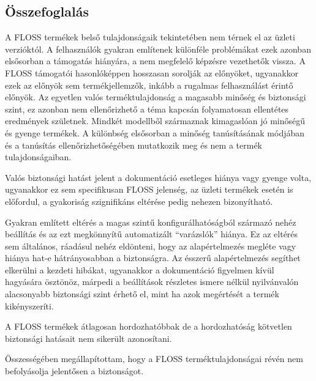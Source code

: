 \documentclass[12pt,magyar,a4paper,oneside]{scrreprt}
\begin{document}
\hypertarget{uxf6sszefoglaluxe1s-3}{%
\subsection{Összefoglalás}\label{uxf6sszefoglaluxe1s-3}}

A FLOSS termékek belső tulajdonságaik tekintetében nem térnek el az
üzleti verzióktól. A felhasználók gyakran említenek különféle
problémákat ezek azonban elsősorban a támogatás hiányára, a nem
megfelelő képzésre vezethetők vissza. A FLOSS támogatói hasonlóképpen
hosszasan sorolják az előnyöket, ugyanakkor ezek az előnyök sem
termékjellemzők, inkább a rugalmas felhasználást érintő előnyök. Az
egyetlen valós terméktulajdonság a magasabb minőség és biztonsági szint,
ez azonban nem ellenőrizhető a téma kapcsán folyamatosan ellentétes
eredmények születnek. Mindkét modellből származnak kimagaslóan jó
minőségű és gyenge termékek. A különbség elsősorban a minőség
tanúsításának módjában és a tanúsítás ellenőrizhetőségében mutatkozik
meg és nem a termék tulajdonságaiban.

Valós biztonsági hatást jelent a dokumentáció esetleges hiánya vagy
gyenge volta, ugyanakkor ez sem specifikusan FLOSS jelenség, az üzleti
termékek esetén is előfordul, a gyakoriság szignifikáns eltérése pedig
nehezen bizonyítható.

Gyakran említett eltérés a magas szintű konfigurálhatóságból származó
nehéz beállítás és az ezt megkönnyítű automatizált ``varázslók'' hiánya.
Ez az eltérés sem általános, ráadásul nehéz eldönteni, hogy az
alapértelmezés megléte vagy hiánya hat-e hátrányosabban a biztonságra.
Az ésszerű alapértelmezés segíthet elkerülni a kezdeti hibákat,
ugyanakkor a dokumentáció figyelmen kívül hagyására ösztönöz, márpedi a
beállítások részletes ismere nélkül nyilvánvalón alacsonyabb biztonsági
szint érhető el, mint ha azok megértését a termék kikényszeríti.

A FLOSS termékek átlagosan hordozhatóbbak de a hordozhatóság kötvetlen
biztonsági hatásait nem sikerült azonosítani.

Összességében megállapítottam, hogy a FLOSS terméktulajdonságai révén
nem befolyásolja jelentősen a biztonságot.
\end{document}
